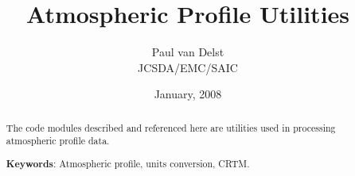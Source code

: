 



\newcommand{\D}{\displaystyle}

\title{Atmospheric Profile Utilities}
\author{Paul van Delst\\JCSDA/EMC/SAIC}
\date{January, 2008}




\maketitle

\begin{abstract}
The code modules described and referenced here are utilities used in processing atmospheric profile data.

\textbf{Keywords}: Atmospheric profile, units conversion, CRTM.
\end{abstract}







\begin{appendix}
\end{appendix}




